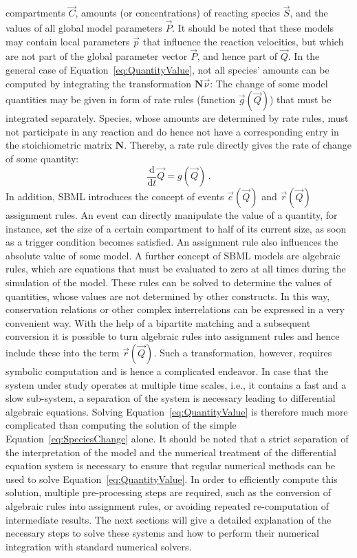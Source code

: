 \documentclass[10pt]{bmc_article}
\newenvironment{bmcformat}{\baselineskip20pt\sloppy\setboolean{publ}{false}}{\baselineskip20pt\sloppy}
\newcommand{\D}{\mathrm{d}}
\begin{document}
\begin{bmcformat}
compartments $\vec{C}$, amounts (or concentrations) of reacting species
$\vec{S}$, and the values of all global model parameters $\vec{P}$.
It should be noted that these models may contain local parameters $\vec{p}$ that
influence the reaction velocities, but which are not part of the global parameter
vector $\vec{P}$, and hence part of $\vec{Q}$.
In the general case of Equation~\ref{eq:QuantityValue}, not all species' amounts
can be computed by integrating the transformation $\mathbf{N}\vec{\nu}$: The
change of some model quantities may be given in form of rate rules (function
$\vec{g}(\vec{Q})$) that must be integrated separately.
Species, whose amounts are determined by rate rules, must not participate in any
reaction and do hence not have a corresponding entry in the stoichiometric
matrix $\mathbf{N}$.
Thereby, a rate rule directly gives the rate of change of some quantity:
\begin{equation}
\frac{\D}{\D t}\vec{Q} = g(\vec{Q})\,.
\end{equation}
In addition, SBML introduces the concept of events $\vec{e}(\vec{Q})$ and
$\vec{r}(\vec{Q})$ assignment rules.
An event can directly manipulate the value of a quantity, for instance,
set the size of a certain compartment to half of its current size, as soon as a
trigger condition becomes satisfied.
An assignment rule also influences the absolute value of some model.
A further concept of SBML models are algebraic rules, which are equations that
must be evaluated to zero at all times during the simulation of the model.
These rules can be solved to determine the values of quantities, whose values
are not determined by other constructs.
In this way, conservation relations or other complex interrelations can be
expressed in a very convenient way.
With the help of a bipartite matching and a subsequent conversion it is possible
to turn algebraic rules into assignment rules and hence include these into the
term $\vec{r}(\vec{Q})$.
Such a transformation, however, requires symbolic computation and is
hence a complicated endeavor.
In case that the system under study operates at multiple time scales, i.e., it
contains a fast and a slow sub-system, a separation of the system is necessary
leading to differential algebraic equations.
Solving Equation~\ref{eq:QuantityValue} is therefore much more complicated than
computing the solution of the simple Equation~\ref{eq:SpeciesChange} alone.
It should be noted that a strict separation of the interpretation of the model
and the numerical treatment of the differential equation system is necessary to
ensure that regular numerical methods can be used to solve
Equation~\ref{eq:QuantityValue}.
In order to efficiently compute this solution, multiple pre-processing steps are
required, such as the conversion of algebraic rules into assignment rules, or
avoiding repeated re-computation of intermediate results.
The next sections will give a detailed explanation of the necessary steps to
solve these systems and how to perform their numerical integration with standard
numerical solvers.



\end{bmcformat}
\end{document}
